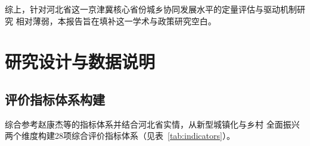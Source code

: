 \documentclass[12pt, a4paper, twoside]{ctexart}
\begin{document}
综上，针对河北省这一京津冀核心省份城乡协同发展水平的定量评估与驱动机制研究
相对薄弱，本报告旨在填补这一学术与政策研究空白。

\section{研究设计与数据说明}

\subsection{评价指标体系构建}

综合参考赵康杰等\cite{zhao2026}的指标体系并结合河北省实情，从新型城镇化与乡村
全面振兴两个维度构建28项综合评价指标体系（见表~\ref{tab:indicators}）。
\end{document}
